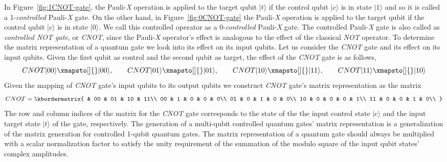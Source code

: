 In Figure~\ref{fig:1CNOT-gate}, the Pauli-\textit{X} operation is applied to the target qubit $\vert t \rangle$ if the control qubit $\vert c \rangle$ is in state $\vert 1 \rangle$ and so it is called a 1-\textit{controlled} Pauli-\textit{X} gate. On the other hand, in Figure~\ref{fig:0CNOT-gate} the Pauli-\textit{X} operation is applied to the target qubit if the control qubit $\vert c \rangle$ is in state $\vert 0 \rangle$. We call this controlled operator as a 0-\textit{controlled} Pauli-\textit{X} gate. The controlled Pauli-\textit{X} gate is also called as \textit{controlled NOT gate}, or \textit{CNOT}, since the Pauli-\textit{X} operator's effect is analogous to the effect of the classical \textit{NOT} operator. To determine the matrix representation of a quantum gate we look into its effect on its input qubits. Let us consider the \textit{CNOT} gate and its effect on its input qubits. Given the first qubit as control and the second qubit as target, the effect of the \textit{CNOT} gate is as follows,
\[
	CNOT\vert 00 \rangle \xmapsto[]{} \vert 00 \rangle, \quad\quad CNOT\vert 01 \rangle \xmapsto[]{} \vert 01 \rangle, \quad\quad CNOT\vert 10 \rangle \xmapsto[]{} \vert 11 \rangle, \quad\quad CNOT\vert 11 \rangle \xmapsto[]{} \vert 10 \rangle
\]
Given the mapping of \textit{CNOT} gate's input qubits to its output qubits we construct \textit{CNOT} gate's matrix representation as the matrix
\[
	CNOT=
	\kbordermatrix{
				& 00 & 01 & 10 & 11\\
		00	&	1	&	0	&	0	&	0\\
		01	&	0	&	1	&	0	&	0\\
		10	&	0	&	0	&	0	&	1\\
		11	&	0	&	0	&	1	&	0\\
	}
\]
The row and column indices of the matrix for the \textit{CNOT} gate corresponds to the state of the the input control state $\vert c \rangle$ and the input target state $\vert t \rangle$ of the gate, respectively. The generation of a multi-qubit controlled quantum gates' matrix representation is a generalization of the matrix generation for controlled 1-qubit quantum gates. The matrix representation of a quantum gate should always be multiplied with a scalar normalization factor to satisfy the unity requirement of the summation of the modulo square of the input qubit states' complex amplitudes.

